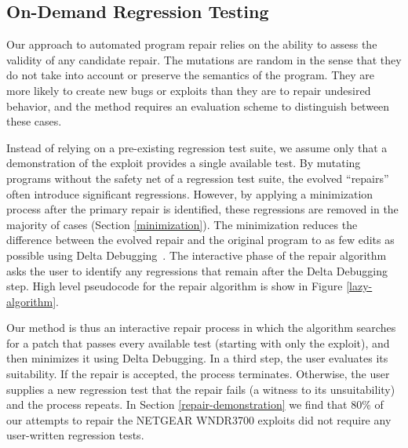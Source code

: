 \documentclass{sigcomm-alternate}
\begin{document}
\subsection{On-Demand Regression Testing}
\label{on-demand-regression}

Our approach to automated program repair relies on the ability to
assess the validity of any candidate repair.  The mutations are random
in the sense that they do not take into account or preserve the
semantics of the program.  They are more likely to create new bugs
or exploits than they are to repair undesired behavior, and the method
requires an evaluation scheme to distinguish between these cases.

Instead of relying on a pre-existing regression test suite, we assume
only that a demonstration of the exploit provides a single available
test.  By mutating programs without the safety net of a regression
test suite, the evolved ``repairs'' often introduce significant
regressions.  However, by applying a minimization process after the
primary repair is identified, these regressions are removed in the
majority of cases (Section \ref{minimization}).  The minimization
reduces the difference between the evolved repair and the original
program to as few edits as possible using Delta
Debugging~\cite{delta}.  The interactive phase of the repair algorithm
asks the user to identify any regressions that remain after the Delta
Debugging step.  High level pseudocode for the repair algorithm is
show in Figure \ref{lazy-algorithm}.

Our method is thus an interactive repair process in which the
algorithm searches for a patch that 
passes every available test (starting with only the exploit), and then
minimizes it using Delta Debugging.  In a third step,
the user evaluates its suitability.  If the repair is accepted, the process
terminates. Otherwise, the user supplies a new regression test that the repair
fails (a witness to its unsuitability) and the process repeats. 
In Section \ref{repair-demonstration} we find that 80\% of our
attempts to repair the NETGEAR WNDR3700 exploits did not require any
user-written regression tests.
\end{document}
